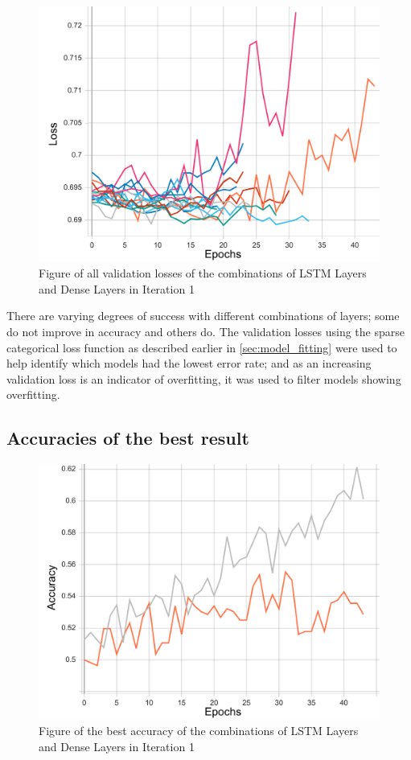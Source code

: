 \begin{figure}[ht]
    \centering
    \includegraphics[width=0.95\columnwidth]{figures/results/lstm/lstm_all_loss.pdf}
    \caption[Validation losses for Iteration 1]{Figure of all validation losses of the combinations of LSTM Layers and Dense Layers in Iteration 1}
    \label{fig:iteration1_all_loss}
\end{figure}
\FloatBarrier

There are varying degrees of success with different combinations of layers; some do not improve in accuracy and others do.
The validation losses using the sparse categorical loss function as described earlier in \autoref{sec:model_fitting}
were used to help identify which models had the lowest error rate; and as an increasing validation
loss is an indicator of overfitting, it was used to filter models showing overfitting.

\subsection{Accuracies of the best result}
\begin{figure}[ht]
    \centering
    \includegraphics[width=0.95\columnwidth]{figures/results/lstm/lstm_2L64-2D32_acc.pdf}
    \caption[Best accuracy for Iteration 1]{Figure of the best accuracy of the combinations of LSTM Layers and Dense Layers in Iteration 1}
    \label{fig:iteration1_best_accuracy}
\end{figure}
\FloatBarrier

